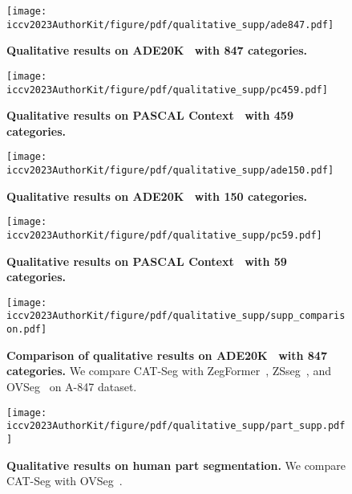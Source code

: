 \documentclass[10pt,twocolumn,letterpaper]{article}
\begin{document}
\begin{figure*}
    \centering
    \texttt{[image: iccv2023AuthorKit/figure/pdf/qualitative\_supp/ade847.pdf]}\hfill\\
    \vspace{-5pt}
    \caption{\textbf{Qualitative results on ADE20K~\cite{zhou2019semantic} with 847 categories.}}
    \label{fig:ade847}\vspace{-5pt}
\end{figure*} \begin{figure*}
    \centering
    \texttt{[image: iccv2023AuthorKit/figure/pdf/qualitative\_supp/pc459.pdf]}\hfill\\
    \vspace{-5pt}
    \caption{\textbf{Qualitative results on PASCAL Context~\cite{mottaghi2014role} with  459 categories.}}
    \label{fig:pc459}\vspace{-5pt}
\end{figure*} \begin{figure*}
    \centering
    \texttt{[image: iccv2023AuthorKit/figure/pdf/qualitative\_supp/ade150.pdf]}\hfill\\
    \vspace{-5pt}
    \caption{\textbf{Qualitative results on ADE20K~\cite{zhou2019semantic} with 150 categories.}}
    \label{fig:ade150}\vspace{-5pt}
\end{figure*} \begin{figure*}
    \centering
    \texttt{[image: iccv2023AuthorKit/figure/pdf/qualitative\_supp/pc59.pdf]}\hfill\\
    \vspace{-5pt}
    \caption{\textbf{Qualitative results on PASCAL Context~\cite{mottaghi2014role} with 59 categories.}}
    \label{fig:pc59}\vspace{-5pt}
\end{figure*} \begin{figure*}
    \centering
    \texttt{[image: iccv2023AuthorKit/figure/pdf/qualitative\_supp/supp\_comparison.pdf]}\hfill\\
    \vspace{-5pt}
    \caption{\textbf{Comparison of qualitative results on ADE20K~\cite{zhou2019semantic} with 847 categories.} We compare CAT-Seg with ZegFormer~\cite{ding2022decoupling}, ZSseg~\cite{xu2022simple}, and OVSeg~\cite{liang2022open} on A-847 dataset.}
    \label{fig:ade847-comparison}\vspace{-5pt}
\end{figure*} 




\begin{figure*}
    \centering
    \texttt{[image: iccv2023AuthorKit/figure/pdf/qualitative\_supp/part\_supp.pdf]}\hfill\\
    \vspace{-5pt}
    \caption{\textbf{Qualitative results on human part segmentation.} We compare CAT-Seg with OVSeg~\cite{liang2022open}.}
    \label{fig:partseg-supple}\vspace{-5pt}
\end{figure*} 
\clearpage
 
\end{document}
